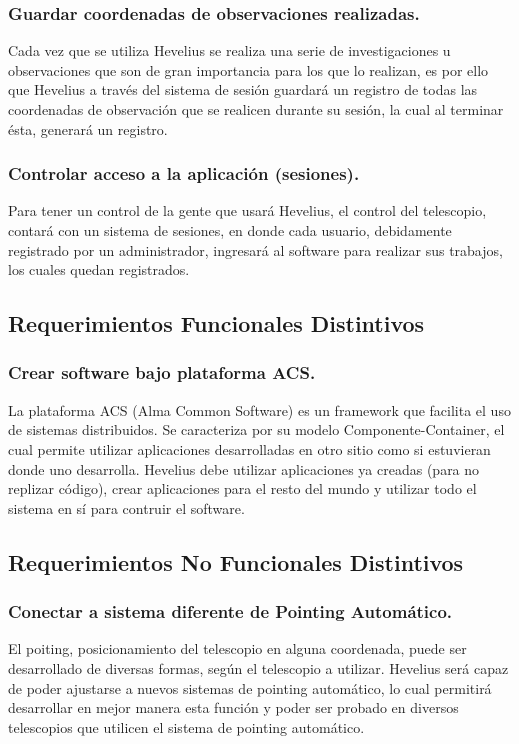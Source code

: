\documentclass[letterpaper,spanish,10pt]{article}
\begin{document}
\subsubsection{Guardar coordenadas de observaciones realizadas.}
Cada vez que se utiliza Hevelius se realiza una serie de investigaciones u observaciones que son de gran importancia para los que lo realizan, es por ello que Hevelius a trav\'es del sistema de sesi\'on guardar\'a un registro de todas las coordenadas de observaci\'on que se realicen durante su sesi\'on, la cual al terminar \'esta, generar\'a un registro.

\subsubsection{Controlar acceso a la aplicaci\'on (sesiones).}
Para tener un control de la gente que usar\'a Hevelius, el control del telescopio, contar\'a con un sistema de sesiones, en donde cada usuario, debidamente registrado por un administrador, ingresar\'a al software para realizar sus trabajos, los cuales quedan registrados.


\subsection{Requerimientos Funcionales Distintivos}
\subsubsection{Crear software bajo plataforma ACS.}
La plataforma ACS (Alma Common Software) es un framework que facilita el uso de sistemas distribuidos. Se caracteriza por su modelo Componente-Container, el cual permite utilizar aplicaciones desarrolladas en otro sitio como si estuvieran donde uno desarrolla. Hevelius debe utilizar aplicaciones ya creadas (para no replizar c\'odigo), crear aplicaciones para el resto del mundo y utilizar todo el sistema en s\'i para contruir el software.


\subsection{Requerimientos No Funcionales Distintivos}
\subsubsection{Conectar a sistema diferente de Pointing Autom\'atico.}
El poiting, posicionamiento del telescopio en alguna coordenada, puede ser desarrollado de diversas formas, seg\'un el telescopio a utilizar. Hevelius ser\'a capaz de poder ajustarse a nuevos sistemas de pointing autom\'atico, lo cual permitir\'a desarrollar en mejor manera esta funci\'on y poder ser probado en diversos telescopios que utilicen el sistema de pointing autom\'atico.
\end{document}
